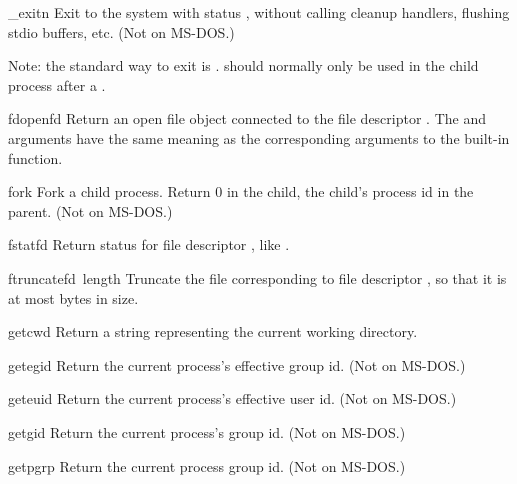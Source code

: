 \begin{funcdesc}{_exit}{n}
Exit to the system with status , without calling cleanup
handlers, flushing stdio buffers, etc.
(Not on MS-DOS.)

Note: the standard way to exit is .
 should normally only be used in the child process
after a .
\end{funcdesc}

\begin{funcdesc}{fdopen}{fd}
Return an open file object connected to the file descriptor .
The  and  arguments have the same meaning as
the corresponding arguments to the built-in  function.
\end{funcdesc}

\begin{funcdesc}{fork}{}
Fork a child process.  Return 0 in the child, the child's process id
in the parent.
(Not on MS-DOS.)
\end{funcdesc}

\begin{funcdesc}{fstat}{fd}
Return status for file descriptor , like .
\end{funcdesc}

\begin{funcdesc}{ftruncate}{fd\, length}
Truncate the file corresponding to file descriptor , 
so that it is at most  bytes in size.
\end{funcdesc}

\begin{funcdesc}{getcwd}{}
Return a string representing the current working directory.
\end{funcdesc}

\begin{funcdesc}{getegid}{}
Return the current process's effective group id.
(Not on MS-DOS.)
\end{funcdesc}

\begin{funcdesc}{geteuid}{}
Return the current process's effective user id.
(Not on MS-DOS.)
\end{funcdesc}

\begin{funcdesc}{getgid}{}
Return the current process's group id.
(Not on MS-DOS.)
\end{funcdesc}

\begin{funcdesc}{getpgrp}{}
Return the current process group id.
(Not on MS-DOS.)
\end{funcdesc}

